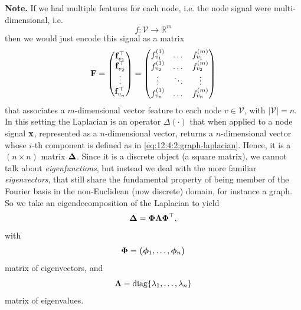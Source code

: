 \textbf{Note.} If we had multiple features for each node, i.e. the node signal were multi-dimensional, i.e.
\begin{equation}
    f: \mathcal{V} \to \mathbb{R}^m
\end{equation}
then we would just encode this signal as a matrix
\begin{equation}
    \vb{F} = \mqty(
        \vb{f}_{v_1}^{\top} \\
        \vb{f}_{v_2}^{\top} \\
        \vdots \\
        \vb{f}_{v_n}^{\top}
    ) = \mqty(
        f_{v_1}^{(1)} & \dots & f_{v_1}^{(m)} \\
        f_{v_2}^{(1)} & \dots & f_{v_2}^{(m)} \\
        \vdots      & \ddots    & \vdots        \\
        f_{v_n}^{(1)} & \dots & f_{v_n}^{(m)} \\
    )
\end{equation}
that associates a $m$-dimensional vector feature to each node $v \in \mathcal{V}$, with $|\mathcal{V}| = n$. 
\\

In this setting the Laplacian is an operator $\Delta(\cdot)$ that when applied to a node signal $\vb{x}$, represented as a $n$-dimensional vector, returns a $n$-dimensional vector whose $i$-th component is defined as in \cref{eq:12:4:2:graph-laplacian}. Hence, it is a $(n \times n)$ matrix $\vb*{\Delta}$. Since it is a discrete object (a square matrix), we cannot talk about \emph{eigenfunctions}, but instead we deal with the more familiar \emph{eigenvectors}, that still share the fundamental property of being member of the Fourier basis in the non-Euclidean (now discrete) domain, for instance a graph. So we take an eigendecomposition of the Laplacian to yield
\begin{equation}
    \vb*{\Delta} = \vb*{\Phi} \vb*{\Lambda} \vb*{\Phi}^{\top},
\end{equation}
with 
\begin{equation}
    \vb*{\Phi} = \mqty(\vb*{\phi}_1, \dots, \vb*{\phi}_n)
\end{equation}
matrix of eigenvectors, and 
\begin{equation}
    \vb*{\Lambda} = \mathrm{diag} \{ \lambda_1, \dots, \lambda_n \}
\end{equation}
matrix of eigenvalues.

